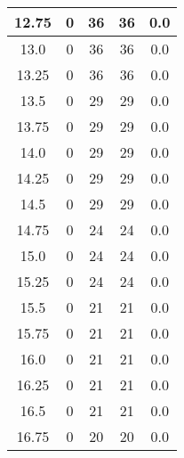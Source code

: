 \documentclass[letterpaper, 12pt]{article}
\begin{document}
\begin{longtable}{|c|c|c|c|c|}
\hline
12.75 & 0 & 36 & 36 & 0.0 \\
\hline
13.0 & 0 & 36 & 36 & 0.0 \\
\hline
13.25 & 0 & 36 & 36 & 0.0 \\
\hline
13.5 & 0 & 29 & 29 & 0.0 \\
\hline
13.75 & 0 & 29 & 29 & 0.0 \\
\hline
14.0 & 0 & 29 & 29 & 0.0 \\
\hline
14.25 & 0 & 29 & 29 & 0.0 \\
\hline
14.5 & 0 & 29 & 29 & 0.0 \\
\hline
14.75 & 0 & 24 & 24 & 0.0 \\
\hline
15.0 & 0 & 24 & 24 & 0.0 \\
\hline
15.25 & 0 & 24 & 24 & 0.0 \\
\hline
15.5 & 0 & 21 & 21 & 0.0 \\
\hline
15.75 & 0 & 21 & 21 & 0.0 \\
\hline
16.0 & 0 & 21 & 21 & 0.0 \\
\hline
16.25 & 0 & 21 & 21 & 0.0 \\
\hline
16.5 & 0 & 21 & 21 & 0.0 \\
\hline
16.75 & 0 & 20 & 20 & 0.0 \\
\hline
\end{longtable}
\end{document}
